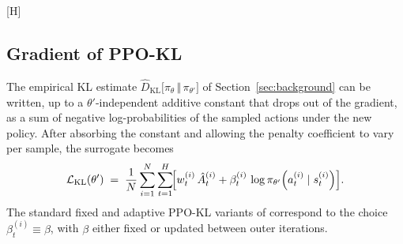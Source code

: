 \documentclass{article}
\makeatletter
\renewenvironment{table}
  {\setlength{\abovecaptionskip}{8\p@}%
   \setlength{\belowcaptionskip}{\z@}%
   \@float{table}}
  {\end@float}
\makeatother
\begin{document}
\begin{table}[H]
\centering
\small
\renewcommand{\arraystretch}{1.6}
\caption{Per-sample contribution of the PPO-Clip objective on the three index sets. The gradient is killed only on $\mathcal{I}_{\mathrm{kill}}$, where further policy change would push the importance ratio further outside the trust region.}
\label{tab:index-sets}
\end{table}

\subsection{Gradient of PPO-KL}

The empirical KL estimate
$\widehat{D}_{\mathrm{KL}}\!\bigl[\pi_\theta \,\Vert\, \pi_{\theta'}\bigr]$
of Section~\ref{sec:background} can be written, up to a
$\theta'$-independent additive constant that drops out of the
gradient, as a sum of negative log-probabilities of the sampled
actions under the new policy. After absorbing the constant and
allowing the penalty coefficient to vary per sample, the surrogate
becomes
\[
\mathcal{L}_{\mathrm{KL}}(\theta')
\;=\;
\frac{1}{N}\sum_{i=1}^{N}\sum_{t=1}^{H}\!\Bigl[
  w_t^{(i)}\,\hat{A}_t^{(i)}
  +
  \beta_t^{(i)}\,\log \pi_{\theta'}\!\left(a_t^{(i)} \mid s_t^{(i)}\right)
\Bigr].
\]
The standard fixed and adaptive PPO-KL variants of
\citet{schulman2017ppo} correspond to the choice
$\beta_t^{(i)} \equiv \beta$, with $\beta$ either fixed or updated
between outer iterations.
\end{document}
